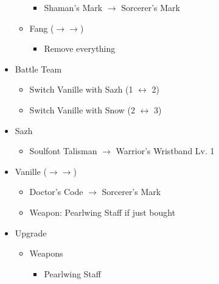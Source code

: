 \begin{paracol}{2}
\begin{menu}
\begin{itemize}
\begin{itemize}
\begin{itemize}
					      \item Shaman's Mark $\rightarrow$ Sorcerer's Mark
				      \end{itemize}
				\item Fang ($\rightarrow\rightarrow$)
				      \begin{itemize}
					      \item Remove everything
				      \end{itemize}
			\end{itemize}
		\end{itemize}
	\end{menu}
	\switchcolumn
	\begin{menu}
		\begin{itemize}
			\paradigm
			\begin{itemize}
				\item Battle Team
				      \begin{itemize}
					      \item Switch Vanille with Sazh (1 $\leftrightarrow$ 2)
					      \item Switch Vanille with Snow (2 $\leftrightarrow$ 3)
				      \end{itemize}
			\end{itemize}
			\equip
			\begin{itemize}
				\item Sazh
				      \begin{itemize}
					      \item Soulfont Talisman $\rightarrow$ Warrior's Wristband Lv. 1
				      \end{itemize}
				\item Vanille ($\rightarrow\rightarrow$)
				      \begin{itemize}
					      \item Doctor's Code $\rightarrow$ Sorcerer's Mark
					      \item Weapon: Pearlwing Staff if just bought
				      \end{itemize}
			\end{itemize}
		\end{itemize}
	\end{menu}
	\begin{upgrade}
		\begin{itemize}
			\item Upgrade
			      \begin{itemize}
				      \item Weapons
				            \begin{itemize}
					            \item Pearlwing Staff

\end{itemize}
\end{itemize}
\end{itemize}
\end{upgrade}
\end{paracol}
